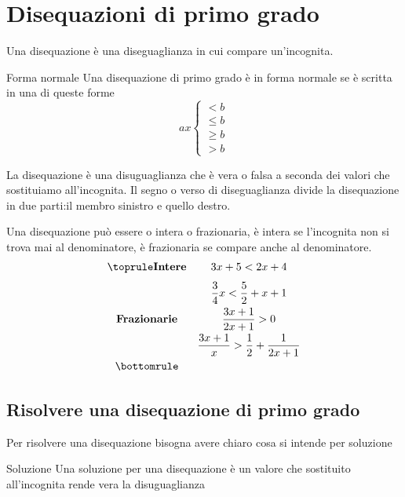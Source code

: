 \section{Disequazioni di primo grado}
\label{sec:Disequuazionidiprimogrado}
\begin{definizionet}{}{}
Una disequazione è una diseguaglianza in cui compare un'incognita.
\end{definizionet}
\begin{definizionet}{Forma normale}{}
	Una disequazione di primo grado è in forma normale se è scritta in una di queste forme
\begin{equation}
ax\left\{ \begin{aligned}
<b\\
\leq b\\
\geq b\\
>b
\end{aligned}\right .   
\end{equation}
\end{definizionet}
La disequazione è una disuguaglianza che è vera o falsa a seconda dei valori che sostituiamo all'incognita.
Il segno o verso di diseguaglianza divide la disequazione in due parti:il membro sinistro e quello destro.

Una disequazione può essere o intera o frazionaria, è intera se l'incognita non si trova mai al denominatore, è frazionaria se compare anche al denominatore.
\[\centering
\begin{array}{cc}
\toprule
\mathbf{Intere}  & 3x+5<2x+4  \\ [.25cm] 
  &\dfrac{3}{4}x<\dfrac{5}{2}+x+1  \\ [.25cm]
\mathbf{Frazionarie}  &\dfrac{3x+1}{2x+1}>0  \\ [.25cm]
 &\dfrac{3x+1}{x}>\dfrac{1}{2}+\dfrac{1}{2x+1}  \\ [.25cm]
\bottomrule
\end{array} 
\]
\subsection{Risolvere una disequazione di primo grado}
Per risolvere una disequazione bisogna avere chiaro cosa si intende per soluzione
\begin{definizionet}{Soluzione}{}
Una soluzione per una disequazione è un valore che sostituito all'incognita rende vera la disuguaglianza
\end{definizionet}

